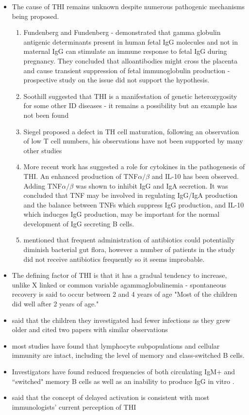 \documentclass[12pt]{article}
\begin{document}
	\begin{itemize}
		
		\item The cause of THI remains unknown despite numerous pathogenic mechanisms being proposed.
		\begin{enumerate}
			\item Fundenberg and Fundenberg - demonstrated that gamma globulin antigenic determinants present in human fetal IgG molecules and not in maternal IgG can stimulate an immune response to fetal IgG during pregnancy. They concluded that alloantibodies might cross the placenta and cause transient suppression of fetal immunoglobulin production - prospective study on the issue did not support the hypothesis. 
			\item Soothill suggested that THI is a manifestation of genetic heterozygosity for some other ID diseases - it remains a possibility but an example has not been found 
			\item Siegel proposed a defect in TH cell maturation, following an observation of low T cell numbers, his observations have not been supported by many other studies
			\item More recent work has suggested a role for cytokines in the pathogenesis of THI. An enhanced production of TNF$\alpha/\beta$ and IL-10 has been observed. Adding TNF$\alpha/\beta$ was shown to inhibit IgG and IgA secretion. It was concluded that TNF may be involved in regulating IgG/IgA production and the balance between TNFs which suppress IgG production, and IL-10 which inducges IgG production, may be important for the normal development of IgG secreting B cells.
			\item \citet{McGeady87} mentioned that frequent administration of antibiotics could potentially diminish bacterial gut flora, however a number of patients in the study did not receive antibiotics frequently so it seems improbable.
		\end{enumerate}
		\item The defining factor of THI is that it has a gradual tendency to increase, unlike X linked or common variable agammaglobulinemia - spontaneous recovery is said to occur between 2 and 4 years of age \citep{Tiller78} "Most of the children did well after 2 years of age." \citep{McGeady87}
		\item \citet{McGeady87} said that the children they investigated had fewer infections as they grew older and cited two papers with similar observations
		\item most studies have found that lymphocyte subpopulations and cellular immunity are intact, including the level of memory and class-switched B cells. 
		\item Investigators have found reduced frequencies of both circulating IgM+ and ``switched" memory B cells as well as an inability to produce IgG in vitro \citep{Ovadia14}.
		\item \citet{McGeady87} said that the concept of delayed activation is consistent with most immunologists' current perception of THI
	\end{itemize} 
	
\end{document}
